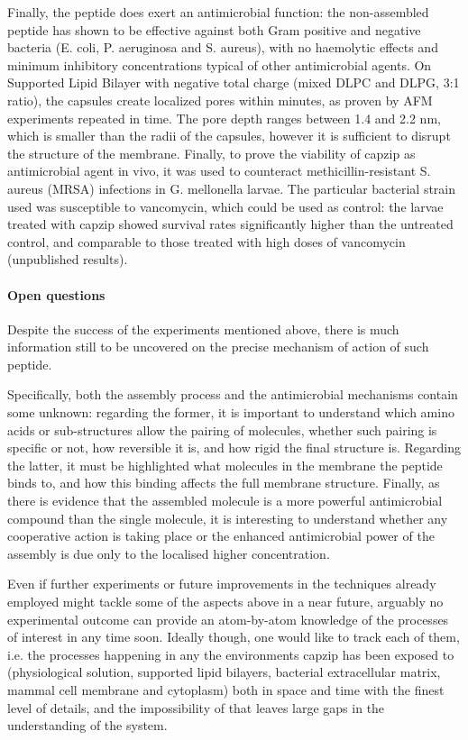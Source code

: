 Finally, the peptide does exert an antimicrobial function: the non-assembled peptide has shown to be effective against both Gram positive and negative bacteria (E. coli, P. aeruginosa and S. aureus), with no haemolytic effects and minimum inhibitory concentrations typical of other antimicrobial agents.
%
On Supported Lipid Bilayer with negative total charge (mixed DLPC and DLPG, 3:1 ratio), the capsules create localized pores within minutes, as proven by AFM experiments repeated in time. The pore depth ranges between 1.4 and 2.2 nm, which is smaller than the radii of the capsules, however it is sufficient to disrupt the structure of the membrane.
%
Finally, to prove the viability of capzip as antimicrobial agent in vivo, it was used to counteract methicillin-resistant S. aureus (MRSA) infections in G. mellonella larvae. The particular bacterial strain used was susceptible to vancomycin, which could be used as control: the larvae treated with capzip showed survival rates significantly higher than the untreated control, and comparable to those treated with high doses of vancomycin (unpublished results).


\paragraph{Open questions} Despite the success of the experiments mentioned above, there is much information still to be uncovered on the precise mechanism of action of such peptide. 

Specifically, both the assembly process and the antimicrobial mechanisms contain some unknown: regarding the former, it is important to understand which amino acids or sub-structures allow the pairing of molecules, whether such pairing is specific or not, how reversible it is, and how rigid the final structure is.
%
Regarding the latter, it must be highlighted what molecules in the membrane the peptide binds to, and how this binding affects the full membrane structure. Finally, as there is evidence that the assembled molecule is a more powerful antimicrobial compound than the single molecule, it is interesting to understand whether any cooperative action is taking place or the enhanced antimicrobial power of the assembly is due only to the localised higher concentration.

Even if further experiments or future improvements in the techniques already employed might tackle some of the aspects above in a near future, arguably no experimental outcome can provide an atom-by-atom knowledge of the processes of interest in any time soon. Ideally though, one would like to track each of them, i.e. the processes happening in any the environments capzip has been exposed to (physiological solution, supported lipid bilayers, bacterial extracellular matrix, mammal cell membrane and cytoplasm) both in space and time with the finest level of details, and the impossibility of that leaves large gaps in the understanding of the system.



